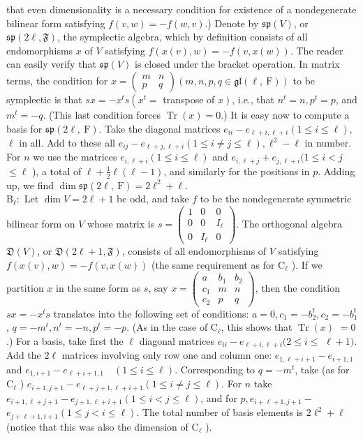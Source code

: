 \documentclass[10pt]{article}
\begin{document}
that even dimensionality is a necessary condition for existence of a nondegenerate bilinear form satisfying $f(v, w)=-f(w, v)$.) Denote by $\mathfrak{s p}(V)$, or $\mathfrak{s p}(2 \ell, \mathfrak{F})$, the symplectic algebra, which by definition consists of all endomorphisms $x$ of $V$ satisfying $f(x(v), w)=-f(v, x(w))$. The reader can easily verify that $\mathfrak{s p}(V)$ is closed under the bracket operation. In matrix terms, the condition for $x=\left(\begin{array}{cc}m & n \\ p & q\end{array}\right)(m, n, p, q \in \mathfrak{g l}(\ell, \mathrm{~F}))$ to be symplectic is that $s x=-x^{t} s\left(x^{t}=\right.$ transpose of $\left.x\right)$, i.e., that $n^{t}=n, p^{t}=p$, and $m^{t}=-q$. (This last condition forces $\operatorname{Tr}(x)=0$.) It is easy now to compute a basis for $\mathfrak{s p}(2 \ell, \mathrm{~F})$. Take the diagonal matrices $e_{i i}-e_{\ell+i, \ell+i}(1 \leq i \leq \ell)$, $\ell$ in all. Add to these all $e_{i j}-e_{\ell+j, \ell+i}(1 \leq i \neq j \leq \ell), \ell^{2}-\ell$ in number. For $n$ we use the matrices $e_{i, \ell+i}(1 \leq i \leq \ell)$ and $e_{i, \ell+j}+e_{j, \ell+i}(1 \leq i<j$ $\leq \ell$ ), a total of $\ell+\frac{1}{2} \ell(\ell-1)$, and similarly for the positions in $p$. Adding up, we find $\operatorname{dim} \mathfrak{s p}(2 \ell, \mathrm{~F})=2 \ell^{2}+\ell$.\\
$\mathrm{B}_{\ell}:$ Let $\operatorname{dim} V=2 \ell+1$ be odd, and take $f$ to be the nondegenerate symmetric bilinear form on $V$ whose matrix is $s=\left(\begin{array}{ccc}1 & 0 & 0 \\ 0 & 0 & I_{\ell} \\ 0 & I_{\ell} & 0\end{array}\right)$. The orthogonal algebra $\mathfrak{D}(V)$, or $\mathfrak{D}(2 \ell+1, \mathfrak{F})$, consists of all endomorphisms of $V$ satisfying $f(x(v), w)=-f(v, x(w))$ (the same requirement as for $\mathrm{C}_{\ell}$ ). If we partition $x$ in the same form as $s$, say $x=\left(\begin{array}{lll}a & b_{1} & b_{2} \\ c_{1} & m & n \\ c_{2} & p & q\end{array}\right)$, then the condition $s x=-x^{t} s$ translates into the following set of conditions: $a=0, c_{1}=-b_{2}^{t}, c_{2}=-b_{1}^{t}$, $q=-m^{t}, n^{t}=-n, p^{t}=-p$. (As in the case of $\mathrm{C}_{\ell}$, this shows that $\operatorname{Tr}(x)$ $=0$.) For a basis, take first the $\ell$ diagonal matrices $e_{i i}-e_{\ell+i, \ell+i}(2 \leq i \leq$ $\ell+1)$. Add the $2 \ell$ matrices involving only row one and column one: $e_{1, \ell+i+1}-e_{i+1,1}$ and $e_{1, i+1}-e_{\ell+i+1,1} \quad(1 \leq i \leq \ell)$. Corresponding to $q=-m^{t}$, take (as for $\mathrm{C}_{\ell}$ ) $e_{i+1, j+1}-e_{\ell+j+1, \ell+i+1}(1 \leq i \neq j \leq \ell)$. For $n$ take $e_{i+1, \ell+j+1}-e_{j+1, \ell+i+1}(1 \leq i<j \leq \ell)$, and for $p, e_{i+\ell+1, j+1}-$ $e_{j+\ell+1, i+1}(1 \leq j<i \leq \ell)$. The total number of basis elements is $2 \ell^{2}+\ell$ (notice that this was also the dimension of $\mathrm{C}_{\ell}$ ).\\
\end{document}
